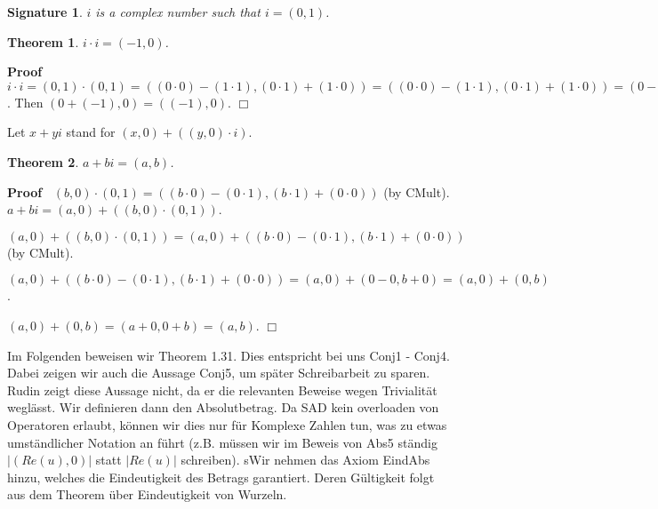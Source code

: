 \documentclass{article}
\newenvironment{forthel}{\begin{leftbar}}{\end{leftbar}}
\newenvironment{proof}{\noindent\textbf{Proof\ }}{\hspace*{\fill}$\Box$\medskip}
\newtheorem{theorem}{Theorem}
\newtheorem{signature}{Signature}
\newcommand{\cmul}{\cdot}
\newcommand{\cadd}{+}
\newcommand{\di }{i}
\begin{document}
\begin{forthel}
\begin{signature} $\di $ is a complex number such that $\di  = (0,1)$.

\end{signature}

\begin{theorem} $\di  \cmul \di  = (-1,0)$.
\end{theorem}\begin{proof}
  $\di  \cmul \di  = (0,1)  \cmul  (0,1) 
= ((0 \cdot 0) - (1 \cdot 1),( 0 \cdot 1) + (1 \cdot 0))
=((0 \cdot 0) - (1 \cdot 1),( 0 \cdot 1) + (1 \cdot 0)) 
= (0 - 1, 0+0) 
= (0+(-1),0)$.\newline
Then $(0+(-1),0) = ((-1),0)$. 
\end{proof}


Let $x+y\di $ stand for $(x,0)  \cadd  ((y,0) \cmul \di )$.


\begin{theorem} $a+b\di  = (a,b)$.
\end{theorem}\begin{proof}
$(b,0) \cmul (0,1) = ((b \cdot 0)-(0 \cdot 1) , (b \cdot 1)+(0 \cdot 0))$ (by CMult).\newline
$a+b\di  = (a,0)  \cadd  ((b,0) \cmul (0,1))$. \newline

$(a,0)  \cadd  ((b,0) \cmul (0,1))
= (a,0)  \cadd  ((b \cdot 0)-(0 \cdot 1) , (b \cdot 1)+(0 \cdot 0))$ (by CMult).\newline

$(a,0)  \cadd  ((b \cdot 0)-(0 \cdot 1) , (b \cdot 1)+(0 \cdot 0))
= (a,0)  \cadd  (0-0,b+0) 
= (a,0)  \cadd  (0,b)$.\newline

$(a,0) \cadd (0,b)
= (a+0,0+b) 
= (a,b)$.
\end{proof}

\end{forthel}
Im Folgenden beweisen wir Theorem 1.31. Dies entspricht bei uns Conj1 - Conj4. Dabei zeigen wir auch die Aussage Conj5, um später Schreibarbeit zu sparen. Rudin zeigt diese Aussage nicht, da er die relevanten Beweise wegen Trivialität weglässt. \newline
Wir definieren dann den Absolutbetrag. Da SAD kein overloaden von Operatoren erlaubt, können wir dies nur für Komplexe Zahlen tun, was zu etwas umständlicher Notation an führt (z.B. müssen wir im Beweis von Abs5 ständig $|(Re(u),0)|$ statt $|Re(u)|$ schreiben).
sWir nehmen das Axiom EindAbs hinzu, welches die Eindeutigkeit des Betrags garantiert. Deren Gültigkeit folgt aus dem Theorem über Eindeutigkeit von Wurzeln.
\end{document}

